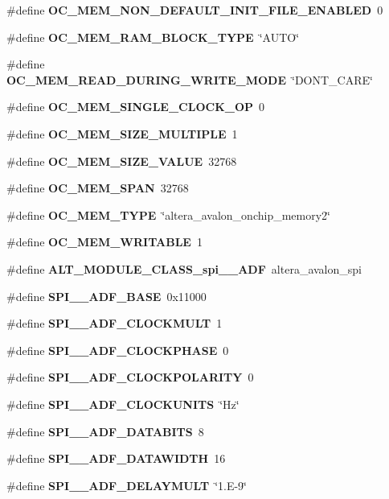 \begin{DoxyCompactItemize}
\item 
\#define {\bf O\+C\+\_\+\+M\+E\+M\+\_\+\+N\+O\+N\+\_\+\+D\+E\+F\+A\+U\+L\+T\+\_\+\+I\+N\+I\+T\+\_\+\+F\+I\+L\+E\+\_\+\+E\+N\+A\+B\+L\+ED}~0
\item 
\#define {\bf O\+C\+\_\+\+M\+E\+M\+\_\+\+R\+A\+M\+\_\+\+B\+L\+O\+C\+K\+\_\+\+T\+Y\+PE}~\char`\"{}A\+U\+TO\char`\"{}
\item 
\#define {\bf O\+C\+\_\+\+M\+E\+M\+\_\+\+R\+E\+A\+D\+\_\+\+D\+U\+R\+I\+N\+G\+\_\+\+W\+R\+I\+T\+E\+\_\+\+M\+O\+DE}~\char`\"{}D\+O\+N\+T\+\_\+\+C\+A\+RE\char`\"{}
\item 
\#define {\bf O\+C\+\_\+\+M\+E\+M\+\_\+\+S\+I\+N\+G\+L\+E\+\_\+\+C\+L\+O\+C\+K\+\_\+\+OP}~0
\item 
\#define {\bf O\+C\+\_\+\+M\+E\+M\+\_\+\+S\+I\+Z\+E\+\_\+\+M\+U\+L\+T\+I\+P\+LE}~1
\item 
\#define {\bf O\+C\+\_\+\+M\+E\+M\+\_\+\+S\+I\+Z\+E\+\_\+\+V\+A\+L\+UE}~32768
\item 
\#define {\bf O\+C\+\_\+\+M\+E\+M\+\_\+\+S\+P\+AN}~32768
\item 
\#define {\bf O\+C\+\_\+\+M\+E\+M\+\_\+\+T\+Y\+PE}~\char`\"{}altera\+\_\+avalon\+\_\+onchip\+\_\+memory2\char`\"{}
\item 
\#define {\bf O\+C\+\_\+\+M\+E\+M\+\_\+\+W\+R\+I\+T\+A\+B\+LE}~1
\item 
\#define {\bf A\+L\+T\+\_\+\+M\+O\+D\+U\+L\+E\+\_\+\+C\+L\+A\+S\+S\+\_\+spi\+\_\+\_\+\+A\+DF}~altera\+\_\+avalon\+\_\+spi
\item 
\#define {\bf S\+P\+I\+\_\+\_\+\+A\+D\+F\+\_\+\+B\+A\+SE}~0x11000
\item 
\#define {\bf S\+P\+I\+\_\+\_\+\+A\+D\+F\+\_\+\+C\+L\+O\+C\+K\+M\+U\+LT}~1
\item 
\#define {\bf S\+P\+I\+\_\+\_\+\+A\+D\+F\+\_\+\+C\+L\+O\+C\+K\+P\+H\+A\+SE}~0
\item 
\#define {\bf S\+P\+I\+\_\+\_\+\+A\+D\+F\+\_\+\+C\+L\+O\+C\+K\+P\+O\+L\+A\+R\+I\+TY}~0
\item 
\#define {\bf S\+P\+I\+\_\+\_\+\+A\+D\+F\+\_\+\+C\+L\+O\+C\+K\+U\+N\+I\+TS}~\char`\"{}Hz\char`\"{}
\item 
\#define {\bf S\+P\+I\+\_\+\_\+\+A\+D\+F\+\_\+\+D\+A\+T\+A\+B\+I\+TS}~8
\item 
\#define {\bf S\+P\+I\+\_\+\_\+\+A\+D\+F\+\_\+\+D\+A\+T\+A\+W\+I\+D\+TH}~16
\item 
\#define {\bf S\+P\+I\+\_\+\_\+\+A\+D\+F\+\_\+\+D\+E\+L\+A\+Y\+M\+U\+LT}~\char`\"{}1.\+E-\/9\char`\"{}
\item 

\end{DoxyCompactItemize}
